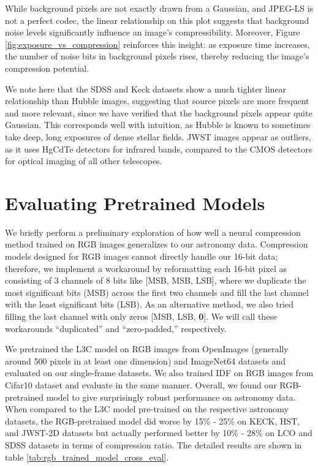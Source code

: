 While background pixels are not exactly drawn from a Gaussian, and JPEG-LS is not a perfect codec, the linear relationship on this plot suggests that background noise levels significantly influence an image's compressibility.
Moreover, Figure \ref{fig:exposure_vs_compression} reinforces this insight: as exposure time increases, the number of noise bits in background pixels rises, thereby reducing the image's compression potential.

We note here that the SDSS and Keck datasets show a much tighter linear relationship than Hubble images, suggesting that source pixels are more frequent and more relevant, since we have verified that the background pixels appear quite Gaussian. This corresponds well with intuition, as Hubble is known to sometimes take deep, long exposures of dense stellar fields. JWST images appear as outliers, as it uses HgCdTe detectors for infrared bands, compared to the CMOS detectors for optical imaging of all other telescopes.

\section{Evaluating Pretrained Models}\label{app:rgb_cross_eval}

We briefly perform a preliminary exploration of how well a neural compression method trained on RGB images generalizes to our astronomy data. Compression models designed for RGB images cannot directly handle our 16-bit data; therefore, we implement a workaround by reformatting each 16-bit pixel as consisting of 3 channels of 8 bits like [MSB, MSB, LSB], where we duplicate the most significant bits (MSB) across the first two channels and fill the last channel with the least significant bits (LSB). As an alternative method, we also tried filling the last channel with only zeros [MSB, LSB, \textbf{0}]. We will call these workarounds “duplicated” and “zero-padded,” respectively.

We pretrained the L3C model on RGB images from OpenImages (generally around 500 pixels in at least one dimension) and ImageNet64 datasets and evaluated on our single-frame datasets. We also trained IDF on RGB images from Cifar10 dataset and evaluate in the same manner. Overall, we found our RGB-pretrained model to give surprisingly robust performance on astronomy data. When compared to the L3C model pre-trained on the respective astronomy datasets, the RGB-pretrained model did worse by 15\% - 25\% on KECK, HST, and JWST-2D datasets but actually performed better by 10\% - 28\% on LCO and SDSS datasets in terms of compression ratio. The detailed results are shown in table \ref{tab:rgb_trained_model_cross_eval}.

